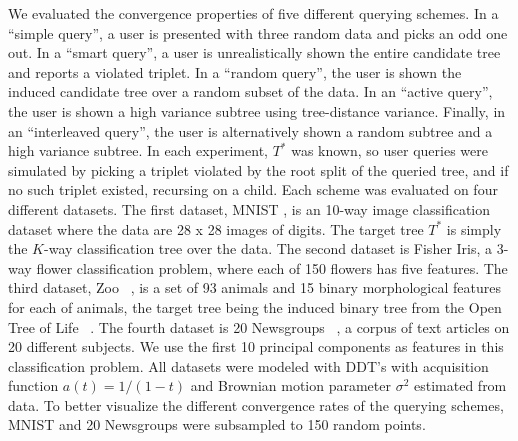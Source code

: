 We evaluated the convergence properties of five different querying schemes.
In a ``simple query'', a user is presented with three random data
and picks an odd one out.
In a ``smart query'', a user is unrealistically shown the entire candidate tree and reports a violated triplet.
In a ``random query'', the user is shown the induced candidate tree over
a random subset of the data.
In an ``active query'', the user is shown a high variance 
subtree using tree-distance variance.
Finally, in an ``interleaved query'', the user is alternatively shown a random
subtree and a high variance subtree.
In each experiment, $T^*$ was known, so user queries were simulated
by picking a triplet
violated by the root split of the queried tree, 
and if no such triplet existed, recursing on a child.
Each scheme was evaluated on four different datasets.
The first dataset, MNIST \cite{MNIST}, is an 10-way image classification
dataset where the data are 28 x 28 images of digits.
The target tree $T^*$ is simply the $K$-way classification 
tree over the data.
The second dataset is Fisher Iris, a 3-way flower
classification problem, where each of 150 flowers has
five features.
The third dataset, Zoo ~\cite{Lichman2013}, is a set of 93 animals
and 15 binary morphological features for each of animals,
the target tree being the induced binary tree 
from the Open Tree of Life ~\cite{Hinchliff2015}.
The fourth dataset is 20 Newsgroups ~\cite{20News}, a
corpus of text articles on 20 different subjects. We use
the first 10 principal components as features
in this classification problem.
All datasets were modeled with DDT's with
acquisition function $a(t) = 1/(1 - t)$
and Brownian motion parameter $\sigma^2$ estimated from data.
To better visualize the different convergence rates
of the querying schemes, MNIST and  20 Newsgroups were subsampled
to 150 random points.

